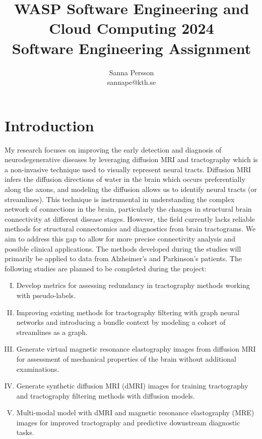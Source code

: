 \documentclass[a4paper, 11pt]{article}
\let\oldAuthor\author
\renewcommand{\author}[1]{\newcommand{\myAuthor}{#1}\oldAuthor{#1}}
\begin{document}
\title{WASP Software Engineering and Cloud Computing 2024 \\ Software Engineering Assignment}
\author{Sanna Persson \\ sannape@kth.se}
\maketitle 

\pagestyle{fancy}
\headheight 35pt 
\rhead{\today}
\lhead{\myAuthor}
\cfoot{\thepage}


\section{Introduction}
My research focuses on improving the early detection and diagnosis of neurodegenerative diseases by leveraging diffusion MRI and tractography which is a non-invasive technique used to visually represent neural tracts. Diffusion MRI infers the diffusion directions of water in the brain which occurs preferentially along the axons, and modeling the diffusion allows us to identify neural tracts (or streamlines). This technique is instrumental in understanding the complex network of connections in the brain, particularly the changes in structural brain connectivity at different disease stages. However, the field currently lacks reliable methods for structural connectomics and diagnostics from brain tractograms. We aim to address this gap to allow for more precise connectivity analysis and possible clinical applications. The methods developed during the studies will primarily be applied to data from Alzheimer's and Parkinson's patients. The following studies are planned to be completed during the project:
\begin{enumerate}[(I)]
\item  Develop metrics for assessing redundancy in tractography methods working with pseudo-labels.

\item Improving existing methods for tractography filtering with graph neural networks and introducing a bundle context by modeling a cohort of streamlines as a graph.

\item Generate virtual magnetic resonance elastography images from diffusion MRI for assessment of mechanical properties of the brain without additional examinations.

\item Generate synthetic diffusion MRI (dMRI) images for training tractography and tractography filtering methods with diffusion models.

\item Multi-modal model with dMRI and magnetic resonance elastography (MRE) images for improved tractography and predictive downstream diagnostic tasks. 
\end{enumerate}
\end{document}

